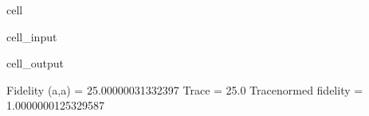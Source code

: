 \documentclass[letterpaper,table,10pt,english]{jupyterBook}
\begin{document}
\begin{sphinxuseclass}{cell}\begin{sphinxVerbatimInput}

\begin{sphinxuseclass}{cell_input}
\begin{sphinxVerbatim}[commandchars=\\\{\}]
\end{sphinxVerbatim}

\end{sphinxuseclass}\end{sphinxVerbatimInput}
\begin{sphinxVerbatimOutput}

\begin{sphinxuseclass}{cell_output}
\begin{sphinxVerbatim}[commandchars=\\\{\}]
Fidelity (a,a) = 25.00000031332397
Trace = 25.0
Trace\PYGZhy{}normed fidelity = 1.0000000125329587
\end{sphinxVerbatim}

\end{sphinxuseclass}\end{sphinxVerbatimOutput}

\end{sphinxuseclass}
\end{document}
